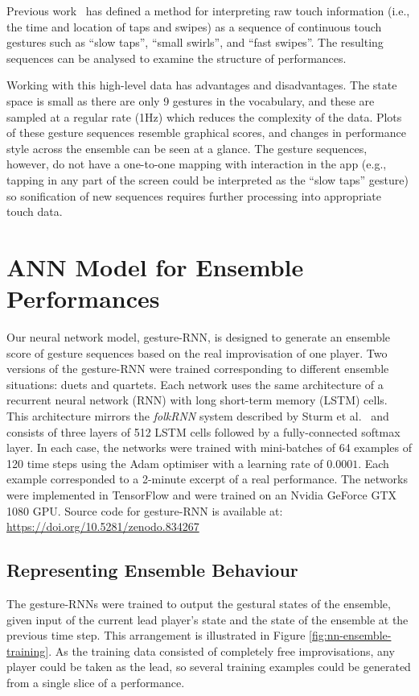 \documentclass[sigchi, authorversion=true]{acmart}
\begin{document}
Previous work~\cite{Martin:2015jk} has defined a method for interpreting raw touch
information (i.e., the time and location of taps and swipes) as a
sequence of continuous touch gestures such as
``slow taps'', ``small swirls'', and ``fast swipes''. The resulting
sequences can be analysed to examine the structure of performances.

Working with this high-level data has advantages and disadvantages.
The state space is small as there are only 9 gestures in the vocabulary,
and these are sampled at a regular rate (1Hz) which reduces the
complexity of the data. Plots of these gesture sequences resemble
graphical scores, and changes in performance style across the ensemble
can be seen at a glance. The gesture sequences, however, do not have a
one-to-one mapping with interaction in the app (e.g., tapping in any
part of the screen could be interpreted as the ``slow taps'' gesture)
so sonification of new sequences requires further processing into
appropriate touch data.

\section{ANN Model for Ensemble Performances}

Our neural network model, gesture-RNN, is designed to generate an
ensemble score of gesture sequences based on the real improvisation of
one player. Two versions of the gesture-RNN were trained corresponding
to different ensemble situations: duets and quartets. Each network
uses the same architecture of a recurrent neural network (RNN) with
long short-term memory (LSTM) cells. This architecture mirrors the
\emph{folkRNN} system described by Sturm et al.~\cite{Sturm:2016rz}
and consists of three layers of 512 LSTM cells followed by a
fully-connected softmax layer. In each case, the networks were trained
with mini-batches of 64 examples of 120
time steps using the Adam optimiser with a learning
rate of $0.0001$. Each example corresponded to a 2-minute
excerpt of a real performance. The networks were
implemented in TensorFlow and were trained on an Nvidia GeForce GTX
1080 GPU. Source code for gesture-RNN is available at:
\url{https://doi.org/10.5281/zenodo.834267}

\subsection{Representing Ensemble Behaviour}

The gesture-RNNs were trained to output the gestural states of the
ensemble, given input of the current lead player's state and the state
of the ensemble at the previous time step. This arrangement is
illustrated in Figure \ref{fig:nn-ensemble-training}. As the training
data consisted of completely free improvisations, any player could be
taken as the lead, so several training examples could be generated from
a single slice of a performance.
\end{document}
